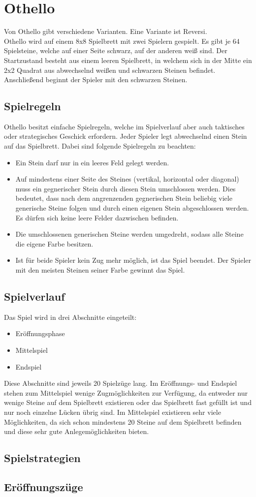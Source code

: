 \chapter{Othello}
\label{othello-chapter}
Von Othello gibt verschiedene Varianten. Eine Variante ist Reversi.
\\Othello wird auf einem 8x8 Spielbrett mit zwei Spielern gespielt. Es gibt je 64 Spielsteine, welche auf einer Seite schwarz, auf der anderen weiß sind. Der Startzustand besteht aus einem leeren Spielbrett, in welchem sich in der Mitte ein 2x2 Quadrat aus abwechselnd weißen und schwarzen Steinen befindet. Anschließend beginnt der Spieler mit den schwarzen Steinen.
\section{Spielregeln}
Othello besitzt einfache Spielregeln, welche im Spielverlauf aber auch taktisches oder strategisches Geschick erfordern. Jeder Spieler legt abwechselnd einen Stein auf das Spielbrett. Dabei sind folgende Spielregeln zu beachten:
\begin{itemize}
\item Ein Stein darf nur in ein leeres Feld gelegt werden.
\item Auf mindestens einer Seite des Steines (vertikal, horizontal oder diagonal) muss ein gegnerischer Stein durch diesen Stein umschlossen werden. Dies bedeutet, dass nach dem angrenzenden gegnerischen Stein beliebig viele generische Steine folgen und durch einen eigenen Stein abgeschlossen werden. Es dürfen sich keine leere Felder dazwischen befinden.
\item Die umschlossenen generischen Steine werden umgedreht, sodass alle Steine die eigene Farbe besitzen.
\item Ist für beide Spieler kein Zug mehr möglich, ist das Spiel beendet. Der Spieler mit den meisten Steinen seiner Farbe gewinnt das Spiel.
\end{itemize}
\section{Spielverlauf}
Das Spiel wird in drei Abschnitte eingeteilt:
\begin{itemize}
\item Eröffnungsphase
\item Mittelspiel
\item Endspiel
\end{itemize}
Diese Abschnitte sind jeweils 20 Spielzüge lang.
Im Eröffnungs- und Endspiel stehen zum Mittelspiel wenige Zugmöglichkeiten zur Verfügung, da entweder nur wenige Steine auf dem Spielbrett existieren oder das Spielbrett fast gefüllt ist und nur noch einzelne Lücken übrig sind. Im Mittelspiel existieren sehr viele Möglichkeiten, da sich schon mindestens 20 Steine auf dem Spielbrett befinden und diese sehr gute Anlegemöglichkeiten bieten. 
\section{Spielstrategien}
\section{Eröffnungszüge}
